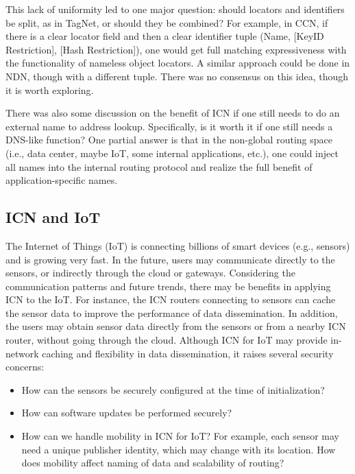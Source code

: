 This lack of uniformity led to one major question: should locators and identifiers
be split, as in TagNet, or should they be combined? For example, in CCN, if there is a clear locator
field and then a clear identifier tuple (Name, [KeyID Restriction], [Hash Restriction]),
one would get full matching expressiveness with the functionality of nameless object locators.
A similar approach could be done in NDN, though with a different tuple.  There was no
consensus on this idea, though it is worth exploring.

There was also some discussion on the benefit of ICN if one still needs to do an external
name to address lookup. Specifically, is it worth it if one still needs a DNS-like function?
One partial answer is that in the non-global routing space (i.e., data center, maybe IoT, some internal
applications, etc.), one could inject all names into the internal routing protocol and realize
the full benefit of application-specific names.

\subsection{ICN and IoT}
The Internet of Things (IoT) is connecting billions of smart devices (e.g., sensors) and is growing
very fast. In the future, users may communicate directly to the sensors, or indirectly through the cloud or gateways.
Considering the communication patterns and future trends, there may be benefits in applying ICN to the IoT. For instance,
the ICN routers connecting to sensors can cache the sensor data to improve the performance of data
dissemination. In addition, the users may obtain sensor data directly from the sensors or from a
nearby ICN router, without going through the cloud. Although ICN for IoT may provide in-network
caching and flexibility in data dissemination, it raises several security concerns:

\begin{itemize}
\item How can the sensors be securely configured at the time of initialization?
\item How can software updates be performed securely?
\item How can we handle mobility in ICN for IoT? For example, each sensor may need a unique publisher
identity, which may change with its location. How does mobility affect naming of data and scalability of routing?
\end{itemize}

